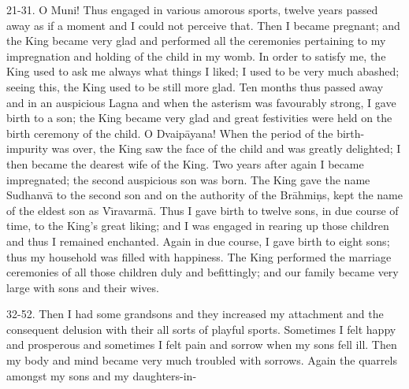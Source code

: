 21-31. O Muni! Thus engaged in various amorous sports, twelve years passed away as if a moment and I could not perceive that. Then I became pregnant; and the King became very glad and performed all the ceremonies pertaining to my impregnation and holding of the child in my womb. In order to satisfy me, the King used to ask me always what things I liked; I used to be very much abashed; seeing this, the King used to be still more glad. Ten months thus passed away and in an auspicious Lagna and when the asterism was favourably strong, I gave birth to a son; the King became very glad and great festivities were held on the birth ceremony of the child. O Dvaip\=ayana! When the period of the birth-impurity was over, the King saw the face of the child and was greatly delighted; I then became the dearest wife of the King. Two years after again I became impregnated; the second auspicious son was born. The King gave the name Sudhanv\=a to the second son and on the authority of the Br\=ahmi\d{n}s, kept the name of the eldest son as V\={\i}ravarm\=a. Thus I gave birth to twelve sons, in due course of time, to the King's great liking; and I was engaged in rearing up those children and thus I remained enchanted. Again in due course, I gave birth to eight sons; thus my household was filled with happiness. The King performed the marriage ceremonies of all those children duly and befittingly; and our family became very large with sons and their wives.

32-52. Then I had some grandsons and they increased my attachment and the consequent delusion with their all sorts of playful sports. Sometimes I felt happy and prosperous and sometimes I felt pain and sorrow when my sons fell ill. Then my body and mind became very much troubled with sorrows. Again the quarrels amongst my sons and my daughters-in-

